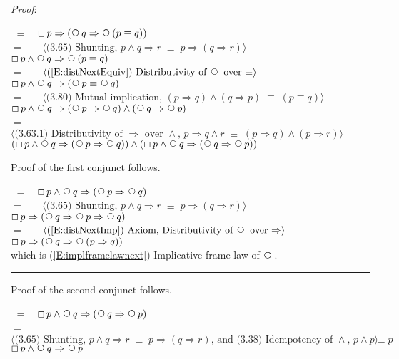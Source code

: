 \documentclass[12pt, fleqn, leqno]{article}
\newcommand{\lgap}{2pt}                             %
\newcommand{\mymathindent}{24pt}                    %
\newcommand{\equivs}{\ensuremath{\;\equiv\;}}       %
\newcommand{\impl}{\ensuremath{\Rightarrow}}        %
\newcommand{\Next}{\;\,\text{\raisebox{3.5pt}{\circle{6}}}}
\newcommand{\Always}{\Box\,}
\newcommand{\myqed}{\rule[-.23ex]{1.2ex}{2.0ex}}
\newcommand{\myqedtab}{\hspace{384pt}}              %
\newcommand{\Gll} {\langle}                         %
\newcommand{\Ggg} {\rangle}                         %
\newcommand{\Hint}[1]     {\ \ \ $\Gll              \mbox{#1} \Ggg$ }   %
\begin{document}
\emph{Proof}: 
\begin{tabbing}
\hspace{\mymathindent} \= $= \;$ \= \myqedtab \= \kill
  \> \>   $\Always p \impl (\Next q \impl \Next (p \equiv q)) $\\[\lgap]
  \> $=$  \>  \Hint{(3.65) Shunting, $p\land q\impl r\equivs p\impl (q\impl r)$}\\[\lgap]
  \> \>   $\Always p \land \Next q \impl \Next (p \equiv q) $\\[\lgap]
  \> $=$  \>  \Hint{(\ref{E:distNextEquiv}) Distributivity of $\Next$ over $\equiv$}\\[\lgap]
  \> \>   $\Always p \land \Next q \impl (\Next p \equiv \Next q) $\\[\lgap]
  \> $=$  \>  \Hint{(3.80) Mutual implication, $(p\impl q) \land (q\impl p) \equivs (p\equiv q)$}\\[\lgap]
  \> \>   $\Always p \land \Next q \impl (\Next p \impl \Next q) \land (\Next q \impl \Next p)$\\[\lgap]
  \> $=$  \>  \Hint{(3.63.1) Distributivity of $\impl$ over $\land$, $p\impl q\land r\equivs (p\impl q)\land (p\impl r)$}\\[\lgap]
  \> \>   $(\Always p \land \Next q \impl (\Next p \impl \Next q)) \land (\Always p \land \Next q \impl (\Next q \impl \Next p))$
  \end{tabbing}
Proof of the first conjunct follows.
\begin{tabbing}
\hspace{\mymathindent} \= $= \;$ \= \myqedtab \= \kill
  \> \>   $\Always p \land \Next q \impl (\Next p \impl \Next q)$\\[\lgap]
  \> $=$  \>  \Hint{(3.65) Shunting, $p\land q\impl r\equivs p\impl (q\impl r)$}\\[\lgap]
  \> \>   $\Always p \impl (\Next q \impl \Next p \impl \Next q)$\\[\lgap]
   \> $=$  \>  \Hint{(\ref{E:distNextImp}) Axiom, Distributivity of $\Next$ over $\impl$}\\[\lgap]
  \> \>   $\Always p \impl (\Next q \impl \Next (p \impl q))$\\[\lgap]
  \> which is (\ref{E:implframelawnext}) Implicative frame law of $\Next$. \quad \myqed
\end{tabbing}
Proof of the second conjunct follows.
\begin{tabbing}
\hspace{\mymathindent} \= $= \;$ \= \myqedtab \= \kill
  \> \>   $\Always p \land \Next q \impl (\Next q \impl \Next p)$\\[\lgap]
  \> $=$  \>  \Hint{(3.65) Shunting, $p\land q\impl r\equivs p\impl (q\impl r)$, and (3.38) Idempotency of $\land$, $p\land p \equiv p$}\\[\lgap]
  \> \>   $\Always p  \land \Next q \impl \Next p$
\end{tabbing}
\end{document}
